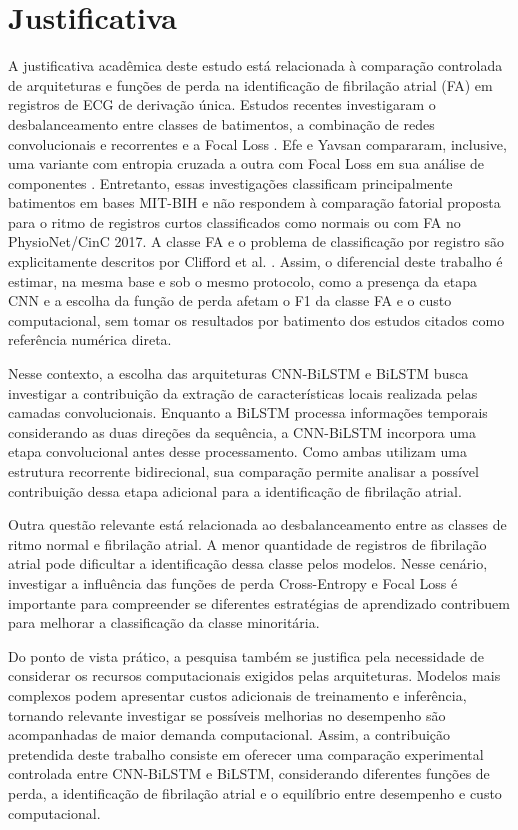 \documentclass[
    12pt,                %
    openright,           %
    oneside,             %
    a4paper,             %
    english,             %
    brazil               %
]{abntex2}
\begin{document}
\section{Justificativa}
\label{sec:justificativa}
A justificativa acadêmica deste estudo está relacionada à comparação controlada de arquiteturas 
e funções de perda na identificação de fibrilação atrial (FA) em registros de ECG de derivação única. Estudos recentes investigaram o desbalanceamento entre classes de batimentos, 
a combinação de redes convolucionais e recorrentes e a Focal Loss
\cite{AlMousa2023,Efe2024,Albarrak2025}. Efe e Yavsan
compararam, inclusive, uma variante com entropia cruzada a outra com
Focal Loss em sua análise de componentes \cite{Efe2024}. Entretanto,
essas investigações classificam principalmente batimentos em bases
MIT-BIH e não respondem à comparação fatorial proposta para o ritmo de
registros curtos classificados como normais ou com FA no PhysioNet/CinC
2017. A classe FA e o problema de classificação por registro são
explicitamente descritos por Clifford et al. \cite{Clifford2017}.
Assim, o diferencial deste trabalho é estimar, na mesma base e sob o mesmo
protocolo, como a presença da etapa CNN e a escolha da função de perda
afetam o F1 da classe FA e o custo computacional, sem tomar os resultados
por batimento dos estudos citados como referência numérica direta.

Nesse contexto, a escolha das arquiteturas CNN-BiLSTM e BiLSTM busca investigar a contribuição da extração de 
características locais realizada pelas camadas convolucionais. Enquanto a BiLSTM processa informações temporais 
considerando as duas direções da sequência, a CNN-BiLSTM incorpora uma etapa convolucional antes desse processamento. 
Como ambas utilizam uma estrutura recorrente bidirecional, sua comparação permite analisar a possível contribuição 
dessa etapa adicional para a identificação de fibrilação atrial.

Outra questão relevante está relacionada ao desbalanceamento entre as classes de ritmo normal e fibrilação atrial. 
A menor quantidade de registros de fibrilação atrial pode dificultar a identificação dessa classe pelos modelos. 
Nesse cenário, investigar a influência das funções de perda Cross-Entropy e Focal Loss é importante para compreender 
se diferentes estratégias de aprendizado contribuem para melhorar a classificação da classe minoritária.

Do ponto de vista prático, a pesquisa também se justifica pela necessidade de considerar os recursos computacionais 
exigidos pelas arquiteturas. Modelos mais complexos podem apresentar custos adicionais de treinamento e inferência, 
tornando relevante investigar se possíveis melhorias no desempenho são acompanhadas de maior demanda computacional. 
Assim, a contribuição pretendida deste trabalho consiste em oferecer uma comparação experimental controlada entre 
CNN-BiLSTM e BiLSTM, considerando diferentes funções de perda, a identificação de fibrilação atrial e o equilíbrio 
entre desempenho e custo computacional.
\end{document}

